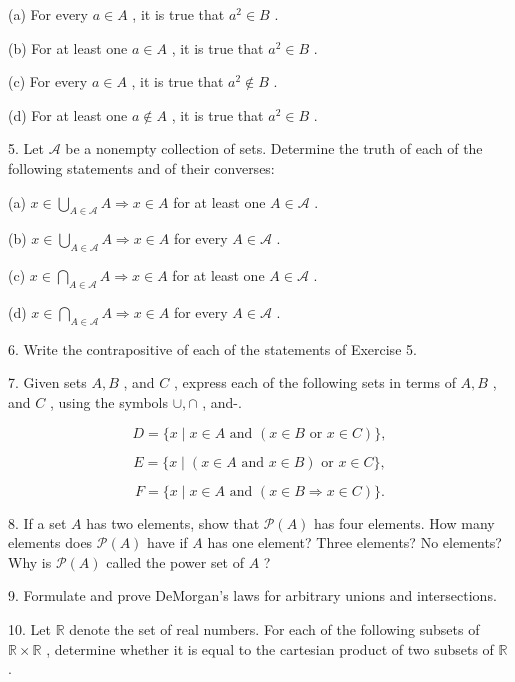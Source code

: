 (a) For every \(a \in  A\) , it is true that \({a}^{2} \in  B\) .

(b) For at least one \(a \in  A\) , it is true that \({a}^{2} \in  B\) .

(c) For every \(a \in  A\) , it is true that \({a}^{2} \notin  B\) .

(d) For at least one \(a \notin  A\) , it is true that \({a}^{2} \in  B\) .

5. Let \(\mathcal{A}\) be a nonempty collection of sets. Determine the truth of each of the following statements and of their converses:

(a) \(x \in  \mathop{\bigcup }\limits_{{A \in  \mathcal{A}}}A \Rightarrow  x \in  A\) for at least one \(A \in  \mathcal{A}\) .

(b) \(x \in  \mathop{\bigcup }\limits_{{A \in  \mathcal{A}}}A \Rightarrow  x \in  A\) for every \(A \in  \mathcal{A}\) .

(c) \(x \in  \mathop{\bigcap }\limits_{{A \in  \mathcal{A}}}A \Rightarrow  x \in  A\) for at least one \(A \in  \mathcal{A}\) .

(d) \(x \in  \mathop{\bigcap }\limits_{{A \in  \mathcal{A}}}A \Rightarrow  x \in  A\) for every \(A \in  \mathcal{A}\) .

6. Write the contrapositive of each of the statements of Exercise 5.

7. Given sets \(A,B\) , and \(C\) , express each of the following sets in terms of \(A,B\) , and \(C\) , using the symbols \(\cup  , \cap\) , and-.

\[
D = \{ x \mid  x \in  A\text{ and }\left( {x \in  B\text{ or }x \in  C}\right) \} ,
\]

\[
E = \{ x \mid  \left( {x \in  A\text{ and }x \in  B}\right) \text{ or }x \in  C\} ,
\]

\[
F = \{ x \mid  x \in  A\text{ and }\left( {x \in  B \Rightarrow  x \in  C}\right) \} .
\]

8. If a set \(A\) has two elements, show that \(\mathcal{P}\left( A\right)\) has four elements. How many elements does \(\mathcal{P}\left( A\right)\) have if \(A\) has one element? Three elements? No elements? Why is \(\mathcal{P}\left( A\right)\) called the power set of \(A\) ?

9. Formulate and prove DeMorgan's laws for arbitrary unions and intersections.

10. Let \(\mathbb{R}\) denote the set of real numbers. For each of the following subsets of \(\mathbb{R} \times  \mathbb{R}\) , determine whether it is equal to the cartesian product of two subsets of \(\mathbb{R}\) .

